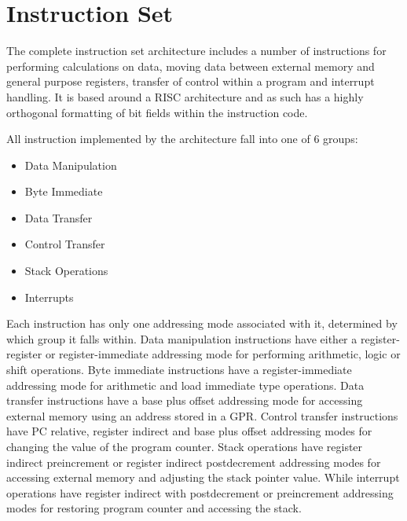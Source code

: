 
\newpage
\section{Instruction Set}

The complete instruction set architecture includes a number of instructions for performing calculations on data, moving data between external memory and general purpose registers, transfer of control within a program and interrupt handling. 
It is based around a RISC architecture and as such has a highly orthogonal formatting of bit fields within the instruction code. 

All instruction implemented by the architecture fall into one of 6 groups:
\begin{itemize}
	\item Data Manipulation
	\item Byte Immediate
	\item Data Transfer
	\item Control Transfer
	\item Stack Operations
	\item Interrupts
\end{itemize}

Each instruction has only one addressing mode associated with it, determined by which group it falls within. 
Data manipulation instructions have either a register-register or register-immediate addressing mode for performing arithmetic, logic or shift operations. 
Byte immediate instructions have a register-immediate addressing mode for arithmetic and load immediate type operations. 
Data transfer instructions have a base plus offset addressing mode for accessing external memory using an address stored in a GPR. 
Control transfer instructions have PC relative, register indirect and base plus offset addressing modes for changing the value of the program counter. 
Stack operations have register indirect preincrement or register indirect postdecrement addressing modes for accessing external memory and adjusting the stack pointer value. 
While interrupt operations have register indirect with postdecrement or preincrement addressing modes for restoring program counter and accessing the stack.
\newpage

